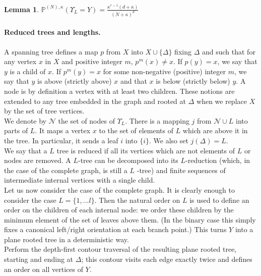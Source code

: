 \documentclass[11pt]{article}
\newtheorem{lemma}{Lemma}[section]
\begin{document}
 \begin{lemma}\label{lemdet2}
$\mathbb{P}^{(N),\kappa}(\Upsilon_L=Y)=\frac {\kappa^{r-1}(d+\kappa)}{(N+\kappa)^d} $
\end{lemma}
\paragraph{Reduced trees and lengths.}
A  spanning tree defines a map $p$ from $X$ into $X\cup \{\Delta\}$ fixing $\Delta$ and such that for any vertex $x$ in $X$ and positive integer $m$, $p^m(x)\neq x$. If $p(y)=x$, we say that $y$ is a child of $x$. If  $p^m(y)=x$ for some non-negative (positive) integer $m$, we say that $y$ is above (strictly above) $x$ and that $x$ is below (strictly below) $y$. A  node is by definition a vertex with at least two children. These notions are extended to any tree embedded in the graph and rooted at $\Delta$ when we replace $X$ by the set of tree vertices. \\
We denote by $\mathcal N$ the set of nodes of $\Upsilon _L$. There is a mapping $j$ from $\mathcal N\cup L$ into parts of $ L$. It maps a vertex $x$ to the set of elements of $L$  which are above it in the tree. In particular, it sends a leaf $i$ into $\{i\}$. We also set  $j(\Delta)=L$.\\
 We say that a $L$ tree is reduced if all its vertices which are not elements of $L$ or nodes are removed. A $L$-tree can be decomposed into its $L$-reduction (which, in the case of the complete graph, is still a $L$ -tree) and finite sequences of intermediate internal vertices with a single child. \\
 
Let us now consider the case of the complete graph. It is clearly enough to consider the case $L=\{1,...l\}$. Then the natural  order on $L$ is used to  define an order on the children of each internal node: we order these children by the minimum element of the set of leaves above them.
 (In the binary case this simply fixes a canonical
left/right orientation at each branch point.)
This turns $Y$ into a plane rooted tree in a deterministic way.\\
 Perform the depth-first contour traversal of the
resulting plane rooted tree, starting and ending at $\Delta$; this contour visits each
edge exactly twice and defines an order on all vertices of $Y$.
\end{document}
